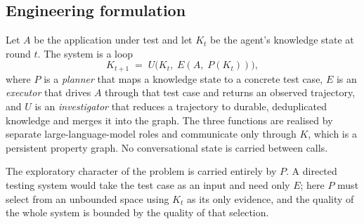 \subsection*{Engineering formulation}

Let $A$ be the application under test and let $K_t$ be the agent's knowledge
state at round $t$. The system is a loop
\[
  K_{t+1} \;=\; U\big(K_t,\; E(A,\; P(K_t))\big),
\]
where $P$ is a \emph{planner} that maps a knowledge state to a concrete test
case, $E$ is an \emph{executor} that drives $A$ through that test case and
returns an observed trajectory, and $U$ is an \emph{investigator} that reduces
a trajectory to durable, deduplicated knowledge and merges it into the graph.
The three functions are realised by separate large-language-model roles and
communicate only through $K$, which is a persistent property graph. No
conversational state is carried between calls.

The exploratory character of the problem is carried entirely by $P$. A directed
testing system would take the test case as an input and need only $E$; here $P$
must select from an unbounded space using $K_t$ as its only evidence, and the
quality of the whole system is bounded by the quality of that selection.

